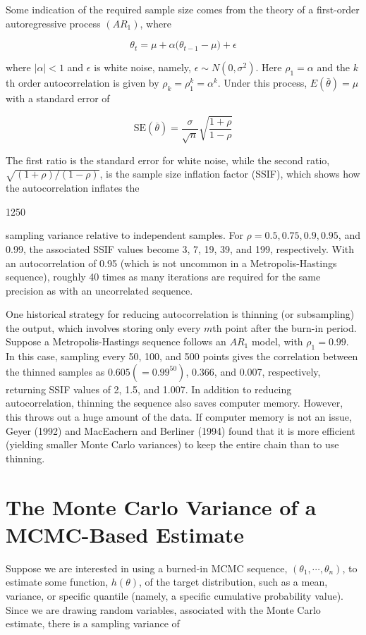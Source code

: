 \documentclass{article}
\begin{document}
Some indication of the required sample size comes from the theory of a first-order autoregressive process  $ (AR_{1}) $, where

\begin{equation}
\theta_{t}=\mu+\alpha\big(\theta_{t-1}-\mu\big)+\epsilon
\end{equation}

where  $ |\alpha| < 1 $ and  $ \epsilon $ is white noise, namely,  $ \epsilon \sim N(0, \sigma^2) $. Here  $ \rho_1 = \alpha $ and the  $ k $th order autocorrelation is given by  $ \rho_k = \rho_1^k = \alpha^k $. Under this process,  $ E(\bar{\theta}) = \mu $ with a standard error of

\begin{equation}
\mathrm{SE}\left(\overline{\theta}\right)=\frac{\sigma}{\sqrt{n}}\sqrt{\frac{1+\rho}{1-\rho}}
\end{equation}

The first ratio is the standard error for white noise, while the second ratio,  $ \sqrt{(1+\rho)/(1-\rho)} $, is the sample size inflation factor (SSIF), which shows how the autocorrelation inflates the

1250

sampling variance relative to independent samples. For  $ \rho = 0.5, 0.75, 0.9, 0.95 $, and 0.99, the associated SSIF values become 3, 7, 19, 39, and 199, respectively. With an autocorrelation of 0.95 (which is not uncommon in a Metropolis-Hastings sequence), roughly 40 times as many iterations are required for the same precision as with an uncorrelated sequence.

One historical strategy for reducing autocorrelation is thinning (or subsampling) the output, which involves storing only every  $ m $th point after the burn-in period. Suppose a Metropolis-Hastings sequence follows an  $ AR_1 $ model, with  $ \rho_1 = 0.99 $. In this case, sampling every 50, 100, and 500 points gives the correlation between the thinned samples as  $ 0.605 (= 0.99^{50}) $, 0.366, and 0.007, respectively, returning SSIF values of 2, 1.5, and 1.007. In addition to reducing autocorrelation, thinning the sequence also saves computer memory. However, this throws out a huge amount of the data. If computer memory is not an issue, Geyer (1992) and MacEachern and Berliner (1994) found that it is more efficient (yielding smaller Monte Carlo variances) to keep the entire chain than to use thinning.

\section{The Monte Carlo Variance of a MCMC-Based Estimate}
Suppose we are interested in using a burned-in MCMC sequence,  $ (\theta_1, \cdots, \theta_n) $, to estimate some function,  $ h(\theta) $, of the target distribution, such as a mean, variance, or specific quantile (namely, a specific cumulative probability value). Since we are drawing random variables, associated with the Monte Carlo estimate, there is a sampling variance of
\end{document}
